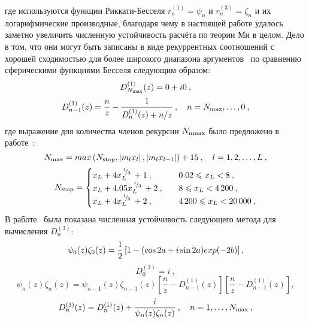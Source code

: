 где используются функции Риккати-Бесселя $r_n^{(1)} = \psi_n$ и
$r_n^{(3)} = \zeta_n$ и их логарифмические производные, благодаря чему
в настоящей работе удалось заметно увеличить численную устойчивость
расчёта по теории Ми в целом. Дело в том, что они могут быть записаны
в виде рекуррентных соотношений с хорошей сходимостью для более
широкого диапазона аргументов~\cite{Wiscombe-1980,Mackowski-1990} по
сравнению сферическими функциями Бесселя следующим образом:
\begin{equation*}
  \label{eq:pena16a}
  D_{N_{\scalebox{0.65}{max}}}^{(1)}(z) = 0 + i0\:,
\end{equation*}
\begin{equation*}
  \label{eq:pena16b}
  D_{n-1}^{(1)}(z) = \frac{n}{z} -\frac{1}{D_n^{(1)}(z)+n/z}\:,\quad n=N_{\rm
    max}, \ldots, 0\:,
\end{equation*}
где выражение для количества членов рекурсии $N_{\rm nmax}$ было
предложено в работе~\cite{Wiscombe-1980}:
\begin{equation*}
  N_{\rm max} = max\left(N_{\rm stop}, \left|m_lx_l\right|,
    \left|m_lx_{l-1}\right|
\right) + 15\:, \quad l=1,2,\ldots,L\:,
\end{equation*}
\begin{equation*}
\label{eq:pena17}
  N_{\rm stop}=
\begin{cases}
x_L+4x_L^{\slantfrac{1}{3}}+1\:,\quad & 0.02\leqslant x_L<8\:,\\
x_L+4.05x_L^{\slantfrac{1}{3}}+2\:,\quad & 8\leqslant x_L<4\,200\:,\\
x_L+4x_L^{\slantfrac{1}{3}}+2\:,\quad & 4\,200\leqslant x_L<20\,000\:.\\
\end{cases}
\end{equation*}
В работе~\cite{Mackowski-1990} была показана численная устойчивость
следующего метода для вычисления $D_n^{(3)}$:
\begin{equation*}
  \label{eq:pena18a}
  \psi_0(z)\zeta_0(z)=\frac{1}{2}
\left[
1-({\rm cos}\,2a+i\,{\rm sin}\,2a)exp(-2b)
\right],
\end{equation*}
\begin{equation*}
  \label{eq:pena18b}
D_0^{(3)} = i\:,
\end{equation*}
\begin{equation*}
  \label{eq:pena18c}
  \psi_n(z)\zeta_n(z)=   \psi_{n-1}(z)\zeta_{n-1}(z)
\left[
\frac{n}{z}-D_{n-1}^{(1)}(z)
\right]
\left[
\frac{n}{z}-D_{n-1}^{(1)}(z)
\right],
\end{equation*}
\begin{equation*}
  \label{eq:pena18d}
D_n^{(3)}(z) = D_n^{(1)}(z)+\frac{i}{\psi_n(z)\zeta_n(z)}\:,\quad
n=1,\ldots, N_{\rm max}\:,
\end{equation*}
